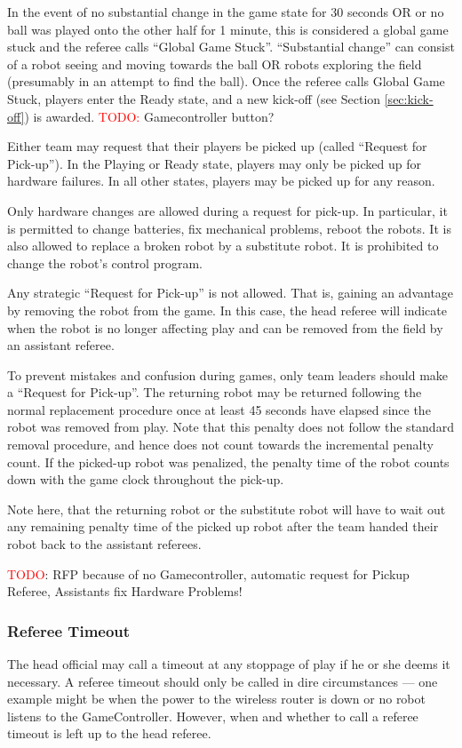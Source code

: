 In the event of no substantial change in the game state for 30 seconds OR or no ball was played onto the other half for 1 minute, this is considered a global game stuck and the referee calls ``Global Game Stuck''. ``Substantial change'' can consist of a robot seeing and moving towards the ball OR robots exploring the field (presumably in an attempt to find the ball). Once the referee calls Global Game Stuck, players enter the Ready state, and a new kick-off (see Section \ref{sec:kick-off}) is awarded.
\textcolor{red}{TODO:} Gamecontroller button?


\label{sec:request_for_pickup}

Either team may request that their players be picked up (called ``Request for Pick-up'').
In the Playing or Ready state, players may only be picked up for hardware failures.
In all other states, players may be picked up for any reason.

Only hardware changes are allowed during a request for pick-up. In particular,
it is permitted to change batteries, fix mechanical problems, reboot the robots.
It is also allowed to replace a broken robot by a substitute robot.
It is prohibited to change the robot's control program.

Any strategic ``Request for Pick-up'' is not allowed.
That is, gaining an advantage by removing the robot from the game.
In this case, the head referee will indicate when the robot is no longer affecting play and can be removed from the field by an assistant referee.

To prevent mistakes and confusion during games, only team leaders should make a ``Request for Pick-up''.
The returning robot may be returned following the normal replacement procedure once at least 45 seconds have elapsed since the robot was removed from play.
Note that this penalty does not follow the standard removal procedure, and hence does not count towards the incremental penalty count.
If the picked-up robot was penalized, the penalty time of the robot counts down with the game clock throughout the pick-up.

Note here, that the returning robot or the substitute robot will have to wait out any remaining penalty time of the picked up robot after the team handed their robot back to the assistant referees.

\textcolor{red}{TODO}: RFP because of no Gamecontroller, automatic request for Pickup Referee, Assistants fix Hardware Problems!

\subsubsection{Referee Timeout}
\label{sec:referee_timeout}
The head official may call a timeout at any stoppage of play if he or she deems it necessary.  A referee timeout should only be called in dire circumstances --- one example might be when the power to the wireless router is down or no robot listens to the GameController.  However, when and whether to call a referee timeout is left up to the head referee.


